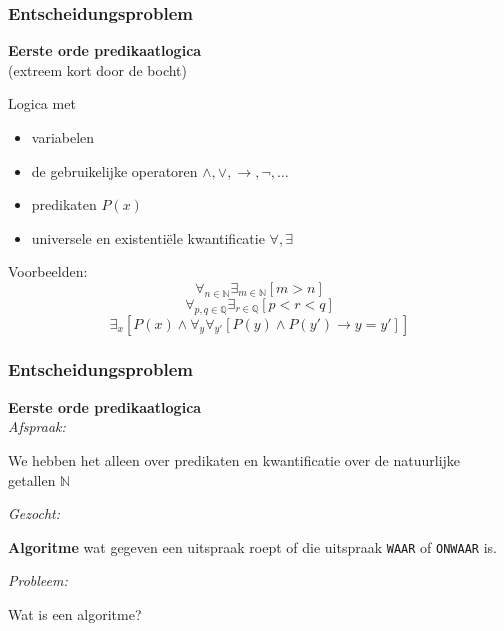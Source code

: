 \documentclass{beamer}
\begin{document}
\begin{frame}
    \frametitle{Entscheidungsproblem}
    \textbf{Eerste orde predikaatlogica} \\
    (extreem kort door de bocht) 
    \bigskip
    
    Logica met
    \begin{itemize}
        \item variabelen
        \item de gebruikelijke operatoren $\wedge, \vee, \rightarrow, \neg, \ldots$
        \item predikaten $P(x)$
        \item universele en existentiële kwantificatie $\forall, \exists$
    \end{itemize}

    Voorbeelden:
    $$\forall_{n \in \mathbb{N}}\exists_{m \in \mathbb{N}} [m>n]$$
    $$\forall_{p, q \in \mathbb{Q}} \exists_{r \in \mathbb{Q}}  [ p < r < q]$$
    $$\exists_x [P(x)\wedge \forall_y \forall_{y'}[P(y) \wedge P(y') \rightarrow y = y']]$$
\end{frame}

\begin{frame}
    \frametitle{Entscheidungsproblem}
    \textbf{Eerste orde predikaatlogica} \\

    \emph{Afspraak:}

    We hebben het alleen over predikaten en kwantificatie over de natuurlijke getallen $\mathbb{N}$

    \vspace{1cm}

    \emph{Gezocht: }
    
    \textbf{Algoritme} wat gegeven een uitspraak roept of die uitspraak \texttt{WAAR} of \texttt{ONWAAR} is.

    \vspace{1cm}
    \emph{Probleem: }
    
    Wat is een algoritme?
\end{frame}
\end{document}
